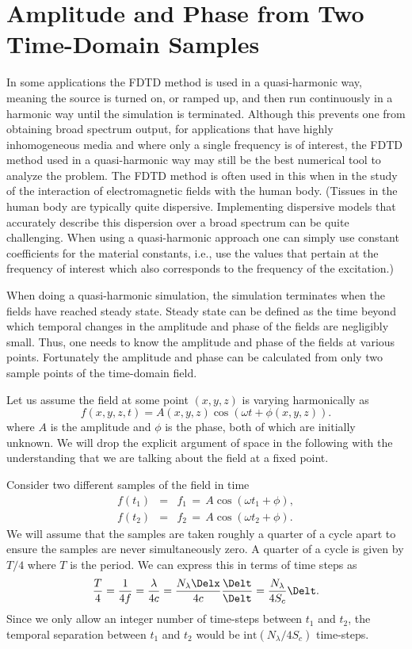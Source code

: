 \section{Amplitude and Phase from Two Time-Domain
  Samples \label{sec:twosamples}}

In some applications the FDTD method is used in a quasi-harmonic way,
meaning the source is turned on, or ramped up, and then run
continuously in a harmonic way until the simulation is terminated.
Although this prevents one from obtaining broad spectrum output, for
applications that have highly inhomogeneous media and where only a
single frequency is of interest, the FDTD method used in a
quasi-harmonic way may still be the best numerical tool to analyze the
problem.  The FDTD method is often used in this when in the study of
the interaction of electromagnetic fields with the human body.
(Tissues in the human body are typically quite dispersive.
Implementing dispersive models that accurately describe this
dispersion over a broad spectrum can be quite challenging.  When using
a quasi-harmonic approach one can simply use constant coefficients for
the material constants, i.e., use the values that pertain at the
frequency of interest which also corresponds to the frequency of the
excitation.)

When doing a quasi-harmonic simulation, the simulation terminates when
the fields have reached steady state.  Steady state can be defined as
the time beyond which temporal changes in the amplitude and phase of
the fields are negligibly small.  Thus, one needs to know the amplitude
and phase of the fields at various points.  Fortunately the amplitude
and phase can be calculated from only two sample points of the
time-domain field.

Let us assume the field at some point $(x,y,z)$ is varying harmonically as
\begin{equation}
  f(x,y,z,t) = A(x,y,z) \cos(\omega t + \phi(x,y,z)).
\end{equation}
where $A$ is the amplitude and $\phi$ is the phase, both of which are
initially unknown.  We will drop the explicit argument of space in the
following with the understanding that we are talking about the field
at a fixed point.

Consider two different samples of the field in time
\begin{eqnarray}
  f(t_1) &=& f_1 \, = \, A \cos(\omega t_1 + \phi), \\
  f(t_2) &=& f_2 \, = \, A \cos(\omega t_2 + \phi).
\end{eqnarray}
We will assume that the samples are taken roughly a quarter of a cycle
apart to ensure the samples are never simultaneously zero.  A quarter
of a cycle is given by $T/4$ where $T$ is the period.  We can express
this in terms of time steps as
\begin{equation}
\frac{T}{4} =
 \frac{1}{4f} = 
 \frac{\lambda}{4c} = 
 \frac{N_\lambda \Delx}{4c}\frac{\Delt}{\Delt} = 
 \frac{N_\lambda}{4S_c} \Delt.
\end{equation}
Since we only allow an integer number of time-steps between $t_1$ and
$t_2$, the temporal separation between $t_1$ and $t_2$ would be
$\mbox{int}(N_\lambda/4S_c)$ time-steps.

